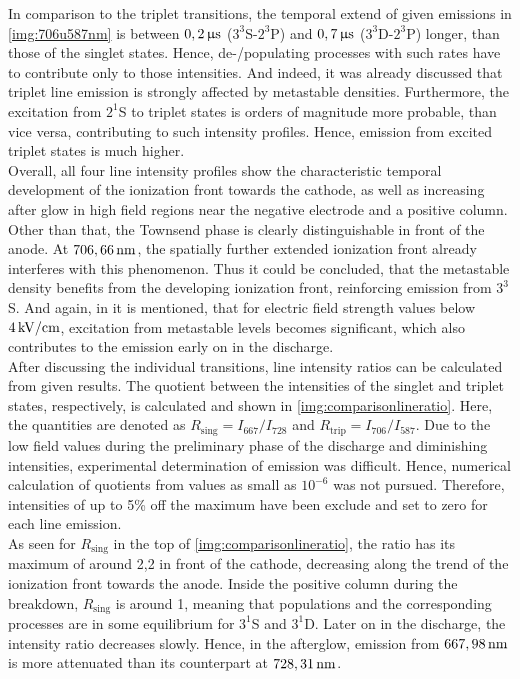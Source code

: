 \documentclass[a4paper,10pt,twoside]{article}
\newcommand{\tenpo}[1]{ 10^{#1}}
\newcommand{\ix}[1]{_\text{#1}}
\begin{document}
		In comparison to the triplet transitions, the temporal extend of given emissions in \autoref{img:706u587nm} is between $\unit[0,2]{\upmu s}$ ($3^3$S-$2^3$P) and $\unit[0,7]{\upmu s}$ ($3^3$D-$2^3$P) longer, than those of the singlet states. Hence, de-/populating processes with such rates have to contribute only to those intensities. And indeed, it was already discussed that triplet line emission is strongly affected by metastable densities. Furthermore, the excitation from $2^1$S to triplet states is orders of magnitude more probable, than vice versa, contributing to such intensity profiles. Hence, emission from excited triplet states is much higher.\\
		Overall, all four line intensity profiles show the characteristic temporal development of the ionization front towards the cathode, as well as increasing after glow in high field regions near the negative electrode and a positive column. Other than that, the Townsend phase is clearly distinguishable in front of the anode. At $\unit[706,66]{nm}$, the spatially further extended ionization front already interferes with this phenomenon. Thus it could be concluded, that the metastable density benefits from the developing ionization front, reinforcing emission from $3^3$S. And again, in \cite{linratio1_14} it is mentioned, that for electric field strength values below $\unit[4]{kV/cm}$, excitation from metastable levels becomes significant, which also contributes to the emission early on in the discharge.\\
		After discussing the individual transitions, line intensity ratios can be calculated from given results. The quotient between the intensities of the singlet and triplet states, respectively, is calculated and shown in \autoref{img:comparisonlineratio}. Here, the quantities are denoted as $R\ix{sing}=I\ix{667}/I\ix{728}$ and $R\ix{trip}=I\ix{706}/I\ix{587}$. Due to the low field values during the preliminary phase of the discharge and diminishing intensities, experimental determination of emission was difficult. Hence, numerical calculation of quotients from values as small as $\tenpo{-6}$ was not pursued. Therefore, intensities of up to 5\% off the maximum have been exclude and set to zero for each line emission.\\
		As seen for $R\ix{sing}$ in the top of \autoref{img:comparisonlineratio}, the ratio has its maximum of around 2,2 in front of the cathode, decreasing along the trend of the ionization front towards the anode. Inside the positive column during the breakdown, $R\ix{sing}$ is around 1, meaning that populations and the corresponding processes are in some equilibrium for $3^1$S and $3^1$D. Later on in the discharge, the intensity ratio decreases slowly. Hence, in the afterglow, emission from $\unit[667,98]{nm}$ is more attenuated than its counterpart at $\unit[728,31]{nm}$.\\
\end{document}
